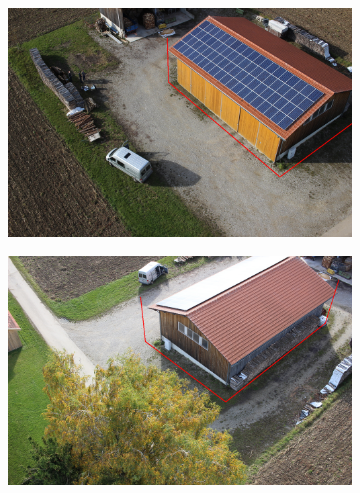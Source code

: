 \begin{figure}[H]
    \centering
       \begin{subfigure}[tbp]{0.31\columnwidth}
           \centering
           \includegraphics[width=\textwidth]{optimize/IMG_0735_osm_ori.png}
           \caption[]{}%
           {{\small }}
           \label{fig:5a}
       \end{subfigure} 
       \begin{subfigure}[tbp]{0.31\columnwidth}  
           \centering 
           \includegraphics[width=\textwidth]{optimize/IMG_0765_osm_ori.png}
           \caption[]{}%
           {{\small }}    
           \label{fig:5b}
       \end{subfigure}
       \begin{subfigure}[tbp]{0.31\columnwidth}  
           \centering 

\end{subfigure}
\end{figure}
